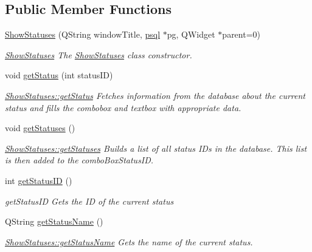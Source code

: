 \subsection*{Public Member Functions}
\begin{DoxyCompactItemize}
\item 
\mbox{\hyperlink{class_show_statuses_a5f33b2e8d68add734ceb466de0fc80ae}{Show\+Statuses}} (Q\+String window\+Title, \mbox{\hyperlink{classpsql}{psql}} $\ast$pg, Q\+Widget $\ast$parent=0)
\begin{DoxyCompactList}\small\item\em \mbox{\hyperlink{class_show_statuses}{Show\+Statuses}} The \mbox{\hyperlink{class_show_statuses}{Show\+Statuses}} class constructor. \end{DoxyCompactList}\item 
void \mbox{\hyperlink{class_show_statuses_a688fb68ab4f0e65666b61137aa70aed9}{get\+Status}} (int status\+ID)
\begin{DoxyCompactList}\small\item\em \mbox{\hyperlink{class_show_statuses_a688fb68ab4f0e65666b61137aa70aed9}{Show\+Statuses\+::get\+Status}} Fetches information from the database about the current status and fills the combobox and textbox with appropriate data. \end{DoxyCompactList}\item 
\mbox{\label{class_show_statuses_a78ceb898d01bd2892e1ef942672666ec}} 
void \mbox{\hyperlink{class_show_statuses_a78ceb898d01bd2892e1ef942672666ec}{get\+Statuses}} ()
\begin{DoxyCompactList}\small\item\em \mbox{\hyperlink{class_show_statuses_a78ceb898d01bd2892e1ef942672666ec}{Show\+Statuses\+::get\+Statuses}} Builds a list of all status I\+Ds in the database. This list is then added to the combo\+Box\+Status\+ID. \end{DoxyCompactList}\item 
int \mbox{\hyperlink{class_show_statuses_accb269831b12a839751cb7ae2822dfe1}{get\+Status\+ID}} ()
\begin{DoxyCompactList}\small\item\em get\+Status\+ID Gets the ID of the current status \end{DoxyCompactList}\item 
Q\+String \mbox{\hyperlink{class_show_statuses_a311ebb73bbc52089506fb31d7936bcb3}{get\+Status\+Name}} ()
\begin{DoxyCompactList}\small\item\em \mbox{\hyperlink{class_show_statuses_a311ebb73bbc52089506fb31d7936bcb3}{Show\+Statuses\+::get\+Status\+Name}} Gets the name of the current status. \end{DoxyCompactList}\item 

\end{DoxyCompactItemize}
